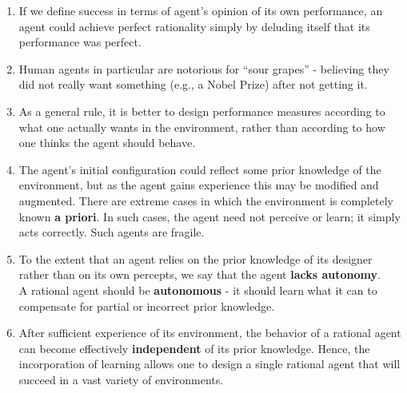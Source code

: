 \begin{enumerate}[itemsep=0.2cm]
    \item  If we define success in terms of agent’s opinion of its own performance, an agent could achieve perfect rationality simply by deluding itself that its performance was perfect. 
    \hfill \cite{ai/book/Artificial-Intelligence-A-Modern-Approach/Russell-Norvig}

    \item Human agents in particular are notorious for “sour grapes” - believing they did not really want something (e.g., a Nobel Prize) after not getting it.
    \hfill \cite{ai/book/Artificial-Intelligence-A-Modern-Approach/Russell-Norvig}

    \item As a general rule, it is better to design performance measures according to what one actually wants in the environment, rather than according to how one thinks the agent should behave.
    \hfill \cite{ai/book/Artificial-Intelligence-A-Modern-Approach/Russell-Norvig}

    \item The agent’s initial configuration could reflect some prior knowledge of the environment, but as the agent gains experience this may be modified and augmented. There are extreme cases in which the environment is completely known \textbf{a priori}. In such cases, the agent need not perceive or learn; it simply acts correctly. Such agents are fragile.
    \hfill \cite{ai/book/Artificial-Intelligence-A-Modern-Approach/Russell-Norvig}

    \item To the extent that an agent relies on the prior knowledge of its designer rather than on its own percepts, we say that the agent \textbf{lacks autonomy}.
    \hfill \cite{ai/book/Artificial-Intelligence-A-Modern-Approach/Russell-Norvig}
    \\
    A rational agent should be \textbf{autonomous} - it should learn what it can to compensate for partial or incorrect prior knowledge. 
    \hfill \cite{ai/book/Artificial-Intelligence-A-Modern-Approach/Russell-Norvig}

    \item After sufficient experience of its environment, the behavior of a rational agent can become effectively \textbf{independent} of its prior knowledge. Hence, the incorporation of learning allows one to design a single rational agent that will succeed in a vast variety of environments.
    \hfill \cite{ai/book/Artificial-Intelligence-A-Modern-Approach/Russell-Norvig}

    
\end{enumerate}




